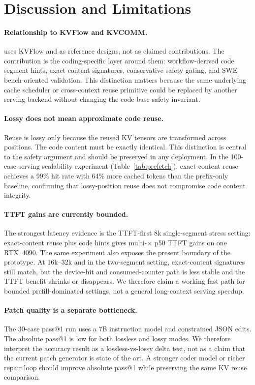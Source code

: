 \section{Discussion and Limitations}

\paragraph{Relationship to KVFlow and KVCOMM.}
\system uses KVFlow and \kvcomm as reference designs, not as claimed contributions.
The contribution is the coding-specific layer around them: workflow-derived code segment hints, exact content signatures, conservative safety gating, and SWE-bench-oriented validation.
This distinction matters because the same underlying cache scheduler or cross-context reuse primitive could be replaced by another serving backend without changing the code-base safety invariant.

\paragraph{Lossy does not mean approximate code reuse.}
Reuse is lossy only because the reused KV tensors are transformed across positions.
The code content must be exactly identical.
This distinction is central to the safety argument and should be preserved in any deployment.
In the 100-case serving scalability experiment (Table~\ref{tab:prefetch}), exact-content reuse achieves a 99\% hit rate with 64\% more cached tokens than the prefix-only baseline, confirming that lossy-position reuse does not compromise code content integrity.

\paragraph{TTFT gains are currently bounded.}
The strongest latency evidence is the TTFT-first 8k single-segment stress setting: exact-content reuse plus code hints gives multi-$\times$ p50 TTFT gains on one RTX~4090.
The same experiment also exposes the present boundary of the prototype.
At 16k--32k and in the two-segment setting, exact-content signatures still match, but the device-hit and consumed-counter path is less stable and the TTFT benefit shrinks or disappears.
We therefore claim a working fast path for bounded prefill-dominated settings, not a general long-context serving speedup.

\paragraph{Patch quality is a separate bottleneck.}
The 30-case pass@1 run uses a 7B instruction model and constrained JSON edits.
The absolute pass@1 is low for both lossless and lossy modes.
We therefore interpret the accuracy result as a lossless-vs-lossy delta test, not as a claim that the current patch generator is state of the art.
A stronger coder model or richer repair loop should improve absolute pass@1 while preserving the same KV reuse comparison.

